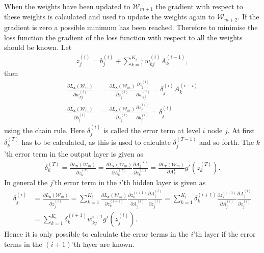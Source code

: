 When the weights have been updated to $\mathcal{W}_{m+1}$ the gradient with respect to these weights is calculated and used to update the weights again to $\mathcal{W}_{m+2}$. If the gradient is zero a possible minimum has been reached. Therefore to minimise the loss function the gradient of the loss function with respect to all the weights should be known. Let
\begin{align*}
    z^{(i)}_{j} = b_{j}^{(i)} + \sum_{k=1}^{K_{i-1}} w_{kj}^{(i)}A_k^{(i-1)},
\end{align*}
then 
\begin{align*}
    \frac{\partial L_{\bm{x}}(\mathcal{W}_m)}{\partial w_{kj}^{(i)}} &= \frac{\partial L_{\bm{x}}(\mathcal{W}_m)}{\partial z^{(i)}_{j}}\frac{\partial z^{(i)}_{j}}{\partial w_{kj}^{(i)}} = \delta^{(i)}_{j} A_k^{(i-i)}\\
    \frac{\partial L_{\bm{x}}(\mathcal{W}_m)}{\partial b_{j}^{(i)}} &= \frac{\partial L_{\bm{x}}(\mathcal{W}_m)}{\partial z^{(i)}_{j}}\frac{\partial z^{(i)}_{j}}{\partial b_{j}^{(i)}} = \delta^{(i)}_{j}
\end{align*}
using the chain rule. Here $\delta^{(i)}_{j}$ is called the error term at level $i$ node $j$. At first $\delta^{(T)}_k$ has to be calculated, as this is used to calculate $\delta^{(T-1)}_j$ and so forth. The $k$'th error term in the output layer is given as
\begin{align*}
    \delta^{(T)}_{k} =  \frac{\partial L_{\bm{x}}(\mathcal{W}_m)}{\partial z^{(T)}_{k}} = \frac{\partial L_{\bm{x}}(\mathcal{W}_m)}{\partial A_k^{(T)}}\frac{\partial A_k^{(T)}}{\partial z^{(T)}_{k}} = \frac{\partial L_{\bm{x}}(\mathcal{W}_m)}{\partial A_k^{T}} g'(z^{(T)}_{k}).
\end{align*}
In general the $j$'th error term in the $i$'th hidden layer is given as
\begin{align*}
    \delta^{(i)}_{j} &= \frac{\partial L_{\bm{x}}(\mathcal{W}_m)}{\partial z^{(i)}_{j}} = \sum_{k = 1}^{K_{i}}  \frac{\partial L_{\bm{x}}(\mathcal{W}_m)}{\partial z^{(i+1)}_{k}} \frac{\partial z^{(i+1)}_{k}}{\partial A^{(i)}_{j}}\frac{\partial A^{(i)}_{j}}{\partial z^{(i)}_{j}} =\sum_{k = 1}^{K_{i}}  \delta^{(i+1)}_{k} \frac{\partial z^{(i+1)}_{k}}{\partial A^{(i)}_{j}}\frac{\partial A^{(i)}_{j}}{\partial z^{(i)}_{j}}\\
    &= \sum_{k = 1}^{K_{i}}  \delta^{(i+1)}_{k} w_{kj}^{i+1}g'\left(z_{j}^{(i)}\right).
\end{align*}
Hence it is only possible to calculate the error terms in the $i$'th layer if the error terms in the $(i+1)$'th layer are known. 

